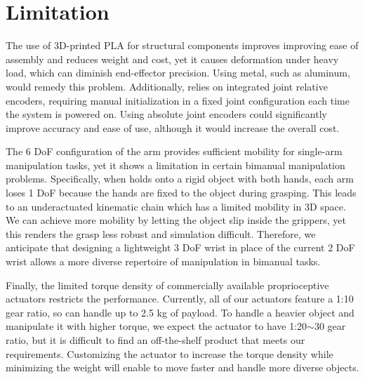 \section{Limitation}
The use of 3D-printed PLA for structural components improves improving ease of assembly and reduces weight and cost, yet it causes deformation under heavy load, which can diminish end-effector precision. Using metal, such as aluminum, would remedy this problem. Additionally, \robot relies on integrated joint relative encoders, requiring manual initialization in a fixed joint configuration each time the system is powered on. Using absolute joint encoders could significantly improve accuracy and ease of use, although it would increase the overall cost. 



The 6 DoF configuration of the arm provides sufficient mobility for single-arm manipulation tasks, yet it shows a limitation in certain bimanual manipulation problems. Specifically, when \robot holds onto a rigid object with both hands, each arm loses 1 DoF because the hands are fixed to the object during grasping. This leads to an underactuated kinematic chain which has a limited mobility in 3D space. We can achieve more mobility by letting the object slip inside the grippers, yet this renders the grasp less robust and simulation difficult. Therefore, we anticipate that designing a lightweight 3 DoF wrist in place of the current 2 DoF wrist allows a more diverse repertoire of manipulation in bimanual tasks.

Finally, the limited torque density of commercially available proprioceptive actuators restricts the performance. Currently, all of our actuators feature a 1:10 gear ratio, so \robot can handle up to 2.5 kg of payload. To handle a heavier object and manipulate it with higher torque, we expect the actuator to have 1:20$\sim$30 gear ratio, but it is difficult to find an off-the-shelf product that meets our requirements. Customizing the actuator to increase the torque density while minimizing the weight will enable \robot to move faster and handle more diverse objects.


